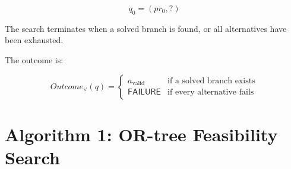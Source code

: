 \documentclass[11pt,letterpaper]{article}
\newcommand{\ask}{\mathord{?}}
\begin{document}
\begin{equation}
\boxed{
q_0=(pr_0,\ask)
}
\end{equation}

The search terminates when a solved
branch is found, or all alternatives
have been exhausted.

The outcome is:

\begin{equation}
\boxed{
Outcome_{\lor}(q)=
\begin{cases}
a_{\mathrm{valid}} &
\text{if a solved branch exists}\\
\mathsf{FAILURE} &
\text{if every alternative fails}
\end{cases}
}
\end{equation}

\section{Algorithm 1: OR-tree Feasibility Search}
\end{document}
